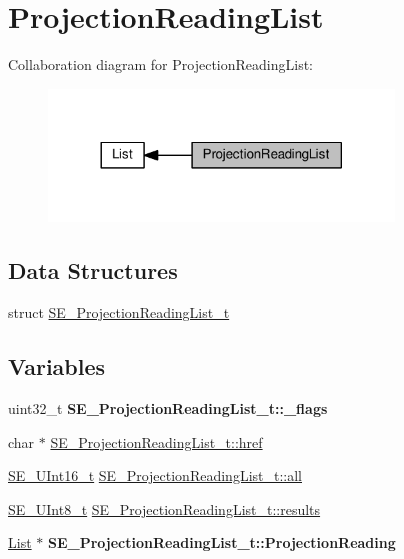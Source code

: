 \hypertarget{group__ProjectionReadingList}{}\section{Projection\+Reading\+List}
\label{group__ProjectionReadingList}
Collaboration diagram for Projection\+Reading\+List\+:\nopagebreak
\begin{figure}[H]
\begin{center}
\leavevmode
\includegraphics[width=260pt]{group__ProjectionReadingList}
\end{center}
\end{figure}
\subsection*{Data Structures}
\begin{DoxyCompactItemize}
\item 
struct \hyperlink{structSE__ProjectionReadingList__t}{S\+E\+\_\+\+Projection\+Reading\+List\+\_\+t}
\end{DoxyCompactItemize}
\subsection*{Variables}
\begin{DoxyCompactItemize}
\item 
\mbox{\label{group__ProjectionReadingList_ga14cb3f5b70d4c59c609d31d2cd5bf4c3}} 
uint32\+\_\+t {\bfseries S\+E\+\_\+\+Projection\+Reading\+List\+\_\+t\+::\+\_\+flags}
\item 
char $\ast$ \hyperlink{group__ProjectionReadingList_gafbb9141bdf291e914094086570ba7eba}{S\+E\+\_\+\+Projection\+Reading\+List\+\_\+t\+::href}
\item 
\hyperlink{group__UInt16_gac68d541f189538bfd30cfaa712d20d29}{S\+E\+\_\+\+U\+Int16\+\_\+t} \hyperlink{group__ProjectionReadingList_ga6eac100bf5814c2361a25d6ea3f5963f}{S\+E\+\_\+\+Projection\+Reading\+List\+\_\+t\+::all}
\item 
\hyperlink{group__UInt8_gaf7c365a1acfe204e3a67c16ed44572f5}{S\+E\+\_\+\+U\+Int8\+\_\+t} \hyperlink{group__ProjectionReadingList_gaadc1fb88b20c64295f8edbd46da6d3ef}{S\+E\+\_\+\+Projection\+Reading\+List\+\_\+t\+::results}
\item 
\mbox{\label{group__ProjectionReadingList_ga88dccfb285f15369080aa88f20251a21}} 
\hyperlink{structList}{List} $\ast$ {\bfseries S\+E\+\_\+\+Projection\+Reading\+List\+\_\+t\+::\+Projection\+Reading}
\end{DoxyCompactItemize}


